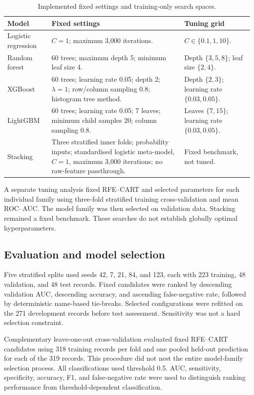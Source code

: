 \begin{table}[tbp]
\centering
\small
\caption{Implemented fixed settings and training-only search spaces.}
\label{tab:python-parameters}
\begin{tabularx}{\textwidth}{@{}p{2.2cm}XX@{}}
\toprule
Model & Fixed settings & Tuning grid \\
\midrule
Logistic regression &
$C=1$; maximum 3,000 iterations. &
$C\in\{0.1,1,10\}$. \\
Random forest &
60 trees; maximum depth 5; minimum leaf size 4. &
Depth $\{3,5,8\}$; leaf size $\{2,4\}$. \\
XGBoost &
60 trees; learning rate 0.05; depth 2; $\lambda=1$; row/column sampling 0.8;
histogram tree method. &
Depth $\{2,3\}$; learning rate $\{0.03,0.05\}$. \\
LightGBM &
60 trees; learning rate 0.05; 7 leaves; minimum child samples 20;
column sampling 0.8. &
Leaves $\{7,15\}$; learning rate $\{0.03,0.05\}$. \\
Stacking &
Three stratified inner folds; probability inputs; standardised logistic
meta-model, $C=1$, maximum 3,000 iterations; no raw-feature passthrough. &
Fixed benchmark, not tuned. \\
\bottomrule
\end{tabularx}
\end{table}
A separate tuning analysis fixed RFE--CART and selected parameters for each individual family using three-fold stratified training cross-validation and mean ROC--AUC. The model family was then selected on validation data. Stacking remained a fixed benchmark. These searches do not establish globally optimal hyperparameters.

\subsection{Evaluation and model selection}
Five stratified splits used seeds 42, 7, 21, 84, and 123, each with 223 training, 48 validation, and 48 test records. Fixed candidates were ranked by descending validation AUC, descending accuracy, and ascending false-negative rate, followed by deterministic name-based tie-breaks. Selected configurations were refitted on the 271 development records before test assessment. Sensitivity was not a hard selection constraint.

Complementary leave-one-out cross-validation evaluated fixed RFE--CART candidates using 318 training records per fold and one pooled held-out prediction for each of the 319 records. This procedure did not nest the entire model-family selection process. All classifications used threshold 0.5. AUC, sensitivity, specificity, accuracy, F1, and false-negative rate were used to distinguish ranking performance from threshold-dependent classification.


